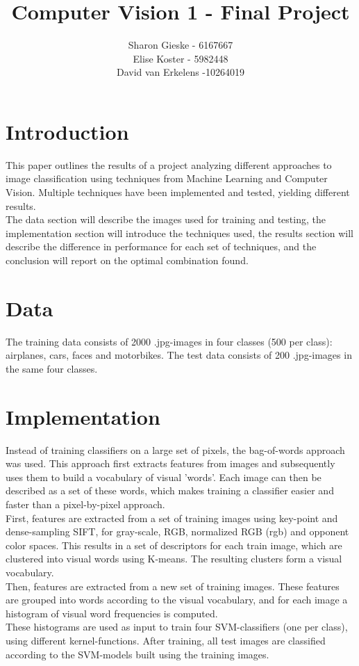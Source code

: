 \documentclass[12pt,a4paper]{article}
\title{Computer Vision 1 - Final Project}
\author{
Sharon Gieske - 6167667\\
Elise Koster - 5982448\\
David van Erkelens -10264019\\
}
\date{}
\begin{document}
\maketitle
\section{Introduction}
This paper outlines the results of a project analyzing different approaches to image classification using techniques from Machine Learning and Computer Vision. Multiple techniques have been implemented and tested, yielding different results.\\
The data section will describe the images used for training and testing, the implementation section will introduce the techniques used, the results section will describe the difference in performance for each set of techniques, and the conclusion will report on the optimal combination found.

\section{Data}
The training data consists of 2000 .jpg-images in four classes (500 per class): airplanes, cars, faces and motorbikes. The test data consists of 200 .jpg-images in the same four classes.

\section{Implementation}
Instead of training classifiers on a large set of pixels, the bag-of-words approach was used. This approach first extracts features from images and subsequently uses them to build a vocabulary of visual 'words'. Each image can then be described as a set of these words, which makes training a classifier easier and faster than a pixel-by-pixel approach. \\
First, features are extracted from a set of training images using key-point and dense-sampling SIFT, for gray-scale, RGB, normalized RGB (rgb) and opponent color spaces. This results in a set of descriptors for each train image, which are clustered into visual words using K-means. The resulting clusters form a visual vocabulary. \\
Then, features are extracted from a new set of training images. These features are grouped into words according to the visual vocabulary, and for each image a histogram of visual word frequencies is computed.\\
These histograms are used as input to train four SVM-classifiers (one per class), using different kernel-functions. After training, all test images are classified according to the SVM-models built using the training images.
\end{document}
